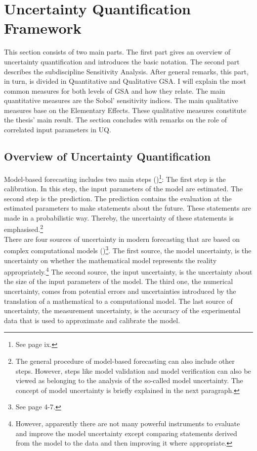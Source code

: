 \documentclass[a4paper,12pt]{article}
\begin{document}
\newpage %

\section{Uncertainty Quantification Framework}
\thispagestyle{plain} %

This section consists of two main parts. The first part gives an overview of uncertainty quantification and introduces the basic notation. The second part describes the subdiscipline Sensitivity Analysis. After general remarks, this part, in turn, is divided in Quantitative and Qualitative GSA. I will explain the most common measures for both levels of GSA and how they relate. The main quantitative measures are the Sobol' sensitivity indices. The main qualitative measures base on the Elementary Effects.
These qualitative measures constitute the thesis' main result. The section concludes with remarks on the role of correlated input parameters in UQ.

\subsection{Overview of Uncertainty Quantification}
Model-based forecasting includes two main steps (\cite{Smith.2014})\footnote{See page ix.}: The first step is the calibration. In this step, the input parameters of the model are estimated. The second step is the prediction. The prediction contains the evaluation at the estimated parameters to make statements about the future. These statements are made in a probabilistic way. Thereby, the uncertainty of these statements is emphasised.\footnote{The general procedure of model-based forecasting can also include other steps. However, steps like model validation and model verification can also be viewed as belonging to the analysis of the so-called model uncertainty. The concept of model uncertainty is briefly explained in the next paragraph.}\\
\newline
There are four sources of uncertainty in modern forecasting that are based on complex computational models (\cite{Smith.2014})\footnote{See page 4-7.}. The first source, the model uncertainty, is the uncertainty on whether the mathematical model represents the reality appropriately.\footnote{However, apparently there are not many powerful instruments to evaluate and improve the model uncertainty except comparing statements derived from the model to the data and then improving it where appropriate.} The second source, the input uncertainty, is the uncertainty about the size of the input parameters of the model. The third one, the numerical uncertainty, comes from potential errors and uncertainties introduced by the translation of a mathematical to a computational model. The last source of uncertainty, the measurement uncertainty, is the accuracy of the experimental data that is used to approximate and calibrate the model.
\end{document}
